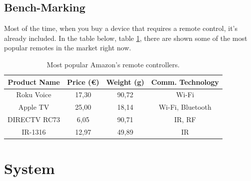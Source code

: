 \documentclass[12pt, letterpaper]{report}
\begin{document}
%
%
%
%

\subsection{Bench-Marking}
Most of the time, when you buy a device that requires a remote control, it's already included. In the table below, table \ref{table:popular_remotes}, there are shown some of the most popular remotes in the market right now.

\begin{table}[h]
    \centering
    \begin{tabular}{||c c c c||} 
    \hline
    Product Name & Price (€) & Weight (g) & Comm. Technology\\
    \hline\hline
    Roku Voice \cite{RokuVoiceRemote} & 17,30 & 90,72 & Wi-Fi\\ 
    Apple TV \cite{AppleTVRemote} & 25,00 & 18,14 & Wi-Fi, Bluetooth \\
    DIRECTV RC73 \cite{DIRECTV_RC73} & 6,05 & 90,71 & IR, RF \\
    IR-1316 \cite{UniversalRemoteControl_Samsung} & 12,97 & 49,89 & IR \\
    \hline
\end{tabular}
				
\caption{Most popular Amazon's remote controllers. }
\label{table:popular_remotes}
\end{table}
		
\section{System}
\end{document}
